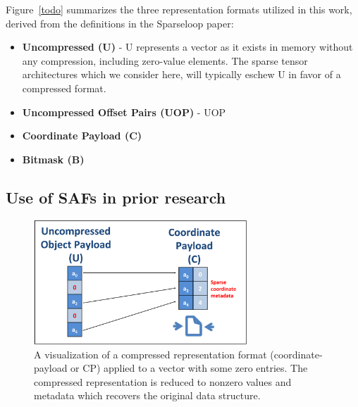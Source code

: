 Figure~\ref{todo} summarizes the three representation formats utilized in this work, derived from the definitions in the Sparseloop\cite{sparseloop} paper:

\begin{itemize}
    \item \textbf{Uncompressed (U)} - U represents a vector as it exists in memory without any compression, including zero-value elements. The sparse tensor architectures which we consider here, will typically eschew U in favor of a compressed format.
    \item \textbf{Uncompressed Offset Pairs (UOP)} - UOP 
    \item \textbf{Coordinate Payload (C)}
    \item \textbf{Bitmask (B)}
\end{itemize}

\subsection{Use of SAFs in prior research}

%
%
\begin{figure}[h]
\includegraphics[width=8cm]{figures/saf_format_optimizations.PNG}
\caption{A visualization of a compressed representation format (coordinate-payload or CP) applied to a vector with some zero entries. The compressed representation is reduced to nonzero values and metadata which recovers the original data structure.}
\label{fig:saf_format_optimizations}
\end{figure}
%
%


